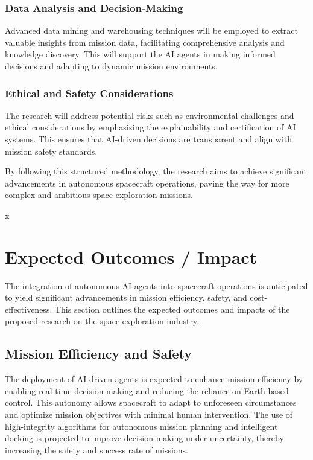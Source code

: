 \documentclass[a4paper,12pt]{article}
\begin{document}
\subsubsection{Data Analysis and Decision-Making}

Advanced data mining and warehousing techniques will be employed to extract valuable insights from mission data, facilitating comprehensive analysis and knowledge discovery. This will support the AI agents in making informed decisions and adapting to dynamic mission environments.

\subsubsection{Ethical and Safety Considerations}

The research will address potential risks such as environmental challenges and ethical considerations by emphasizing the explainability and certification of AI systems. This ensures that AI-driven decisions are transparent and align with mission safety standards.

By following this structured methodology, the research aims to achieve significant advancements in autonomous spacecraft operations, paving the way for more complex and ambitious space exploration missions.



x
\section{Expected Outcomes / Impact}

The integration of autonomous AI agents into spacecraft operations is anticipated to yield significant advancements in mission efficiency, safety, and cost-effectiveness. This section outlines the expected outcomes and impacts of the proposed research on the space exploration industry.

\subsection{Mission Efficiency and Safety}

The deployment of AI-driven agents is expected to enhance mission efficiency by enabling real-time decision-making and reducing the reliance on Earth-based control. This autonomy allows spacecraft to adapt to unforeseen circumstances and optimize mission objectives with minimal human intervention. The use of high-integrity algorithms for autonomous mission planning and intelligent docking is projected to improve decision-making under uncertainty, thereby increasing the safety and success rate of missions.
\end{document}

